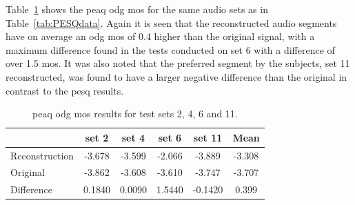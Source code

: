 




Table~\ref{tab:PEAQdataODG} shows the \DIFdelbegin {}\DIFdelend \DIFaddbegin \gls{peaq} \gls{odg} \gls{mos} \DIFaddend for the same audio sets as in Table~\ref{tab:PESQdata}. Again it is seen that the reconstructed audio segments have on average an \DIFdelbegin {}\DIFdelend \DIFaddbegin \gls{odg} \gls{mos} \DIFaddend of 0.4 higher than the original signal, with a maximum difference found in the tests conducted on set 6 with a difference of over 1.5 \DIFdelbegin {}\DIFdelend \DIFaddbegin \gls{mos}\DIFaddend . It was also noted that the preferred segment by the subjects, set 11 reconstructed, was found to have a larger negative difference than the original in contrast to the \DIFdelbegin {}\DIFdelend \DIFaddbegin \gls{pesq} \DIFaddend results.

\begin{table}\begin{center}
\caption{\DIFdelbeginFL {}\DIFdelendFL \DIFaddbeginFL \gls{peaq} \gls{odg} \gls{mos} \DIFaddendFL results for test sets 2, 4, 6 and 11.}
\label{tab:PEAQdataODG}
\begin{tabular}{|l|c|c|c|c|c|}\hline
                    & set 2     & set 4     & set 6     & set 11    & Mean      \\ \hline
  Reconstruction    & -3.678    & -3.599    & -2.066    & -3.889    & -3.308    \\
  Original          & -3.862    & -3.608    & -3.610    & -3.747    & -3.707    \\ \hline
  Difference        & 0.1840    & 0.0090    & 1.5440    & -0.1420   & 0.399     \\
  \hline
\end{tabular}\end{center}\end{table}

